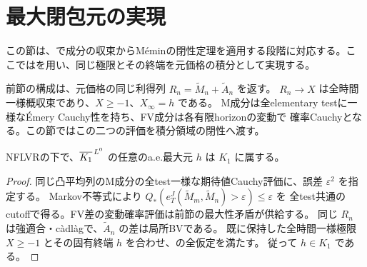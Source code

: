\section{最大閉包元の実現}
\label{sec:realization}
この節は、\cite[Theorem 4.2の証明]{DS}で成分の収束からM\'eminの閉性定理を適用する段階に対応する。ここではを用い、同じ極限とその終端を元価格の積分として実現する。

前節の構成は、元価格の同じ利得列 $R_n=\widetilde M_n+\widetilde A_n$ を返す。
$R_n\to X$ は全時間一様概収束であり、$X\geq-1$、$X_\infty=h$ である。
M成分は全elementary testに一様なÉmery Cauchy性を持ち、FV成分は各有限horizonの変動で
確率Cauchyとなる。この節ではこの二つの評価を積分領域の閉性へ渡す。

\begin{theorem}[最大閉包元の実現]
\label{prop:realization}
NFLVRの下で、$\overline{K_1}^{\,L^0}$ の任意のa.e.最大元 $h$ は $K_1$ に属する。
\end{theorem}
\begin{proof}
同じ凸平均列のM成分の全test一様な期待値Cauchy評価に、誤差 $\varepsilon^2$ を指定する。
Markov不等式により $Q_*(e_T^J(\widetilde M_m,\widetilde M_n)>\varepsilon)\leq\varepsilon$ を
全test共通のcutoffで得る。FV差の変動確率評価は前節の最大性矛盾が供給する。
同じ $R_n$ は強適合・càdlàgで、$\widetilde A_n$ の差は局所BVである。
既に保持した全時間一様極限 $X\geq-1$ とその固有終端 $h$ を合わせ、の全仮定を満たす。
従って $h\in K_1$ である。
\end{proof}
